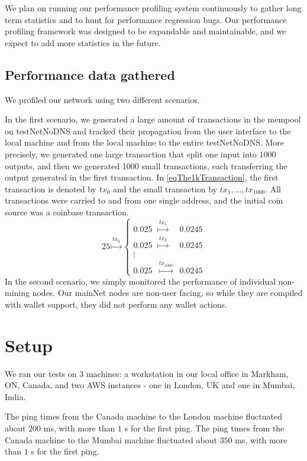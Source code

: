 \documentclass{article}
\begin{document}
We plan on running our performance profiling system continuously to gather long term statistics and to hunt for performance regression bugs. Our performance profiling framework was designed to be expandable and maintainable, and we expect to add more statistics in the future. 

\subsection{Performance data gathered}
We profiled our network using two different scenarios. 

In the first scenario, we generated a large amount of transactions in the mempool on testNetNoDNS and tracked their propagation from the user interface to the local machine and from the local machine to the entire testNetNoDNS. More precisely, we generated one large transaction that split one input into $1000$ outputs, and then we generated 1000 small transactions, each transferring the output generated in the first transaction. In \eqref{eqThe1kTransaction}, the first transaction is denoted by $tx_0$ and the small transaction by $tx_{1},\dots, tx_{1000}$. All transactions were carried to and from one single address, and the initial coin source was a coinbase transaction.
\begin{equation}\label{eqThe1kTransaction}
25 \stackrel{tx_0}{\mapsto} \left\{\begin{array}{lcl}
0.025 & \stackrel{tx_1}{\mapsto}& 0.0245 \\
0.025 & \stackrel{tx_2}{\mapsto}& 0.0245\\
\vdots\\
0.025 & \stackrel{tx_{1000}}{\mapsto}& 0.0245
\end{array} \right.
\end{equation}
In the second scenario, we simply monitored the performance of individual non-mining nodes. Our mainNet nodes are non-user facing, so while they are compiled with wallet support, they did not perform any wallet actions.

\section{Setup}

We ran our tests on $3$ machines: a workstation in our local office in Markham, ON, Canada, and two AWS instances - one in London, UK and one in Mumbai, India. 

The ping times from the Canada machine to the London machine fluctuated about $200$ ms, with more than $1$ s for the first ping. The ping times from the Canada machine to the Mumbai machine fluctuated about $350$ ms, with more than $1$ s for the first ping. 
\end{document}
